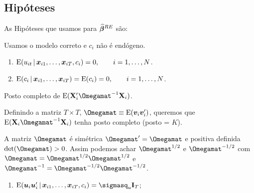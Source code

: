 \documentclass[11pt, oneside, a4paper, article]{article}
\numberwithin{equation}{section}
\begin{document}
\begin{description}

\subsection{Hipóteses}

As Hipóteses que usamos para $\boldsymbol{\widehat{\beta}}^{RE}$ são:

\begin{hypo}[\textbf{RE.1}]
Usamos o modelo correto e $c_{i}$ não é endógeno.

\begin{enumerate}[label =\alph*)]
\item 
$\text{E}( u_{it} \, | \,  \boldsymbol{x}_{i1}, \dots, \boldsymbol{x}_{iT}, c_{i} ) = 0, \qquad i = 1, \dots, N$.

\item        
$\text{E}( c_{i} \, | \, \boldsymbol{x}_{i1}, \dots, \boldsymbol{x}_{iT} ) = \text{E}( c_{i} ) = 0, \qquad i = 1, \dots, N$.
\end{enumerate}
\end{hypo}

\begin{hypo}[\textbf{RE.2}]
Posto completo de $\E( \Xmat_{i}' \Omegamat^{-1} \Xmat_{i} )$.
\end{hypo}

Definindo a matriz $T \times T$,
$\Omegamat \equiv \E(\mbs{v}_{i} \mbs{v}_{i}')$,
queremos que 
$\E( \Xmat_{i} \Omegamat^{-1} \Xmat_{i} )$
tenha posto completo (posto = $K$).

A matriz $\Omegamat$ é simétrica 
$\Omegamat' = \Omegamat$
e positiva definida $\det(\Omegamat) > 0$.
Assim podemos achar $\Omegamat^{1/2}$ e $\Omegamat^{-1/2}$ com 
$\Omegamat = \Omegamat^{1/2} \Omegamat^{1/2}$ e
$\Omegamat^{-1} = \Omegamat^{-1/2} \Omegamat^{-1/2}$.

\begin{hypo}[\textbf{RE.3}]
\item

\begin{enumerate}[label =\alph*)]
\item 
$\E( \uvec_{i} \uvec_{i}' \, | \,  \xvec_{i1}, \dots, \xvec_{iT}, c_{i} ) = \sigmasq_{u}\Imat_{T}$;


\end{enumerate}
\end{hypo}
\end{description}
\end{document}
